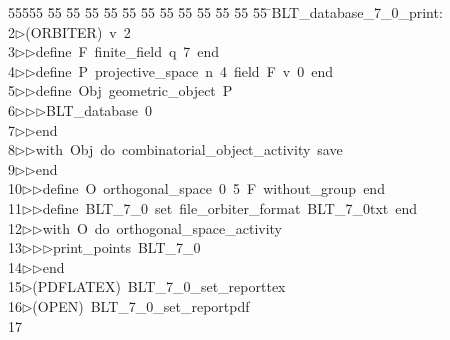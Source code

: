 %
%
\begin{tabbing}
55555 \= 55 \= 55 \= 55 \= 55 \= 55 \= 55 \= 55 \= 55 \= 55 \= 55 \= 55 \= 55 \= \>BLT\_database\_7\_0\_print:\\[0pt]
2\>$\triangleright$\>(ORBITER)\ v\ 2\ \\[0pt]
3\>$\triangleright$\>$\triangleright$\>define\ F\ finite\_field\ q\ 7\ end\ \\[0pt]
4\>$\triangleright$\>$\triangleright$\>define\ P\ projective\_space\ n\ 4\ field\ F\ v\ 0\ end\ \\[0pt]
5\>$\triangleright$\>$\triangleright$\>define\ Obj\ geometric\_object\ P\ \\[0pt]
6\>$\triangleright$\>$\triangleright$\>$\triangleright$\>BLT\_database\ 0\ \\[0pt]
7\>$\triangleright$\>$\triangleright$\>end\ \\[0pt]
8\>$\triangleright$\>$\triangleright$\>with\ Obj\ do\ combinatorial\_object\_activity\ save\ \\[0pt]
9\>$\triangleright$\>$\triangleright$\>end\ \\[0pt]
10\>$\triangleright$\>$\triangleright$\>define\ O\ orthogonal\_space\ 0\ 5\ F\ without\_group\ end\ \\[0pt]
11\>$\triangleright$\>$\triangleright$\>define\ BLT\_7\_0\ set\ file\_orbiter\_format\ BLT\_7\_0txt\ end\ \\[0pt]
12\>$\triangleright$\>$\triangleright$\>with\ O\ do\ orthogonal\_space\_activity\ \\[0pt]
13\>$\triangleright$\>$\triangleright$\>$\triangleright$\>print\_points\ BLT\_7\_0\ \\[0pt]
14\>$\triangleright$\>$\triangleright$\>end\\[0pt]
15\>$\triangleright$\>(PDFLATEX)\ BLT\_7\_0\_set\_reporttex\\[0pt]
16\>$\triangleright$\>(OPEN)\ BLT\_7\_0\_set\_reportpdf\\[0pt]
17\>\end{tabbing}
